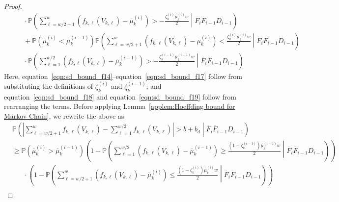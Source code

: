 \documentclass[twoside]{article}
\def\eqref#1{equation~\ref{#1}}
\theoremstyle{plain}
\theoremstyle{definition}
\theoremstyle{remark}
\begin{document}
\begin{proof}
\begin{subequations}
\begin{align}
        &\hspace{20pt} \cdot \mathbb{P}\left(\sum^{w}_{\ell=w/2+1}\left(f_{k,\ell}\left(V_{k,\ell}\right)-\bar{\mu}_{k}^{(i)}\right) > -\frac{\zeta_{k}^{(i)}\bar{\mu}^{(i)}_{k}w}{2} \middle| \overline{F}_{i}\overline{F}_{i-1} D_{i-1}\right)\label{eqn:sd_bound_f17}\\
        &\hspace{20pt} + \mathbb{P}\left(\bar{\mu}^{(i)}_{k}<\bar{\mu}^{(i-1)}_{k}\right)\mathbb{P}\left(\sum^{w}_{\ell=w/2+1}\left(f_{k,\ell}\left(V_{k,\ell}\right)-\bar{\mu}_{k}^{(i)}\right)< \frac{\zeta_{k}^{(i)}\bar{\mu}^{(i)}_{k}w}{2} \middle| \overline{F}_{i}\overline{F}_{i-1} D_{i-1}\right)\label{eqn:sd_bound_f18}\\
        &\hspace{20pt} \cdot \mathbb{P}\left(\sum^{w/2}_{\ell=1}\left(f_{k,\ell}\left(V_{k,\ell}\right)-\bar{\mu}_{k}^{(i-1)}\right) > -\frac{\zeta_{k}^{(i-1)}\bar{\mu}^{(i-1)}_{k}w}{2} \middle| \overline{F}_{i}\overline{F}_{i-1} D_{i-1}\right)\label{eqn:sd_bound_f19}
    \end{align}
\end{subequations}
Here, \eqref{eqn:sd_bound_f14}--\eqref{eqn:sd_bound_f17} follow from substituting the definitions of $\zeta_{k}^{(i)}$ and $\zeta_{k}^{(i-1)}$; and \eqref{eqn:sd_bound_f18} and \eqref{eqn:sd_bound_f19} follow from rearranging the terms.
Before applying Lemma~\ref{applem:Hoeffding bound for Markov Chain}, we rewrite the above as
\begin{subequations}
    \begin{align}
        &\mathbb{P}\left(\left\lvert\sum^{w}_{\ell=w/2+1}f_{k,\ell}\left(V_{k,\ell}\right)-\sum^{w/2}_{\ell=1}f_{k,\ell}\left(V_{k,\ell}\right)\right\rvert > b + b_d \middle| \overline{F}_{i}\overline{F}_{i-1} D_{i-1}\right)\label{eqn:sd_bound_f20}\\
        &\geq \mathbb{P}\left(\bar{\mu}^{(i)}_{k}>\bar{\mu}^{(i-1)}_{k}\right)\left(1-\mathbb{P}\left(\sum^{w/2}_{\ell=1}\left(f_{k,\ell}\left(V_{k,\ell}\right)-\bar{\mu}_{k}^{(i-1)}\right)\geq \frac{\left(1+\zeta_{k}^{(i-1)}\right)\bar{\mu}^{(i-1)}_{k}w}{2} \middle| \overline{F}_{i}\overline{F}_{i-1} D_{i-1}\right)\right)\label{eqn:sd_bound_f21}\\
        &\hspace{20pt} \cdot \left(1-\mathbb{P}\left(\sum^{w}_{\ell=w/2+1}\left(f_{k,\ell}\left(V_{k,\ell}\right)-\bar{\mu}_{k}^{(i)}\right)\leq \frac{\left(1-\zeta_{k}^{(i)}\right)\bar{\mu}^{(i)}_{k}w}{2} \middle| \overline{F}_{i}\overline{F}_{i-1} D_{i-1}\right)\right)\label{eqn:sd_bound_f22}\\

\end{align}
\end{subequations}
\end{proof}
\end{document}
